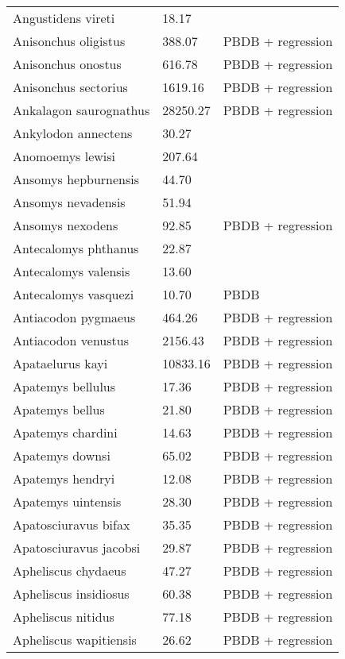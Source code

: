 \documentclass{article}
\begin{document}
\begin{center}
\begin{longtable}{p{} p{} p{} }
  Angustidens vireti & 18.17 & \cite{Tomiya2013} \\ 
  Anisonchus oligistus & 388.07 & PBDB + regression \\ 
  Anisonchus onostus & 616.78 & PBDB + regression \\ 
  Anisonchus sectorius & 1619.16 & PBDB + regression \\ 
  Ankalagon saurognathus & 28250.27 & PBDB + regression \\ 
  Ankylodon annectens & 30.27 & \cite{Tomiya2013} \\ 
  Anomoemys lewisi & 207.64 & \cite{Simons1960} \\ 
  Ansomys hepburnensis & 44.70 & \cite{Tomiya2013} \\ 
  Ansomys nevadensis & 51.94 & \cite{Tomiya2013} \\ 
  Ansomys nexodens & 92.85 & PBDB + regression \\ 
  Antecalomys phthanus & 22.87 & \cite{Tomiya2013} \\ 
  Antecalomys valensis & 13.60 & \cite{Tomiya2013} \\ 
  Antecalomys vasquezi & 10.70 & PBDB \\ 
  Antiacodon pygmaeus & 464.26 & PBDB + regression \\ 
  Antiacodon venustus & 2156.43 & PBDB + regression \\ 
  Apataelurus kayi & 10833.16 & PBDB + regression \\ 
  Apatemys bellulus & 17.36 & PBDB + regression \\ 
  Apatemys bellus & 21.80 & PBDB + regression \\ 
  Apatemys chardini & 14.63 & PBDB + regression \\ 
  Apatemys downsi & 65.02 & PBDB + regression \\ 
  Apatemys hendryi & 12.08 & PBDB + regression \\ 
  Apatemys uintensis & 28.30 & PBDB + regression \\ 
  Apatosciuravus bifax & 35.35 & PBDB + regression \\ 
  Apatosciuravus jacobsi & 29.87 & PBDB + regression \\ 
  Apheliscus chydaeus & 47.27 & PBDB + regression \\ 
  Apheliscus insidiosus & 60.38 & PBDB + regression \\ 
  Apheliscus nitidus & 77.18 & PBDB + regression \\ 
  Apheliscus wapitiensis & 26.62 & PBDB + regression \\ 

\end{longtable}
\end{center}
\end{document}
